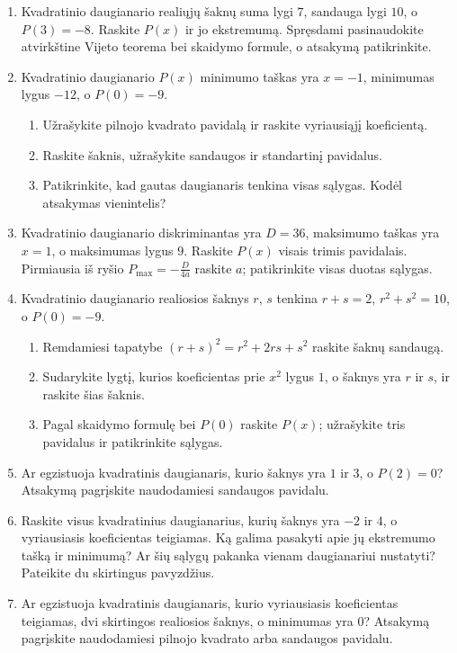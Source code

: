 \documentclass[12pt,a4paper]{article}
\begin{document}
\begin{enumerate}[series=uzdaviniai]
\begin{enumerate}
\item Užrašykite $P(x)$ sandaugos pavidalu ir pagal $P(0)$ raskite vyriausiąjį koeficientą.
\item Užrašykite visus tris daugianario pavidalus ir patikrinkite sąlygas.
\end{enumerate}
\item Kvadratinio daugianario realiųjų šaknų suma lygi $7$, sandauga lygi $10$, o $P(3)=-8$. Raskite $P(x)$ ir jo ekstremumą. Spręsdami pasinaudokite atvirkštine Vijeto teorema bei skaidymo formule, o atsakymą patikrinkite.
\item Kvadratinio daugianario $P(x)$ minimumo taškas yra $x=-1$, minimumas lygus $-12$, o $P(0)=-9$.
\begin{enumerate}
\item Užrašykite pilnojo kvadrato pavidalą ir raskite vyriausiąjį koeficientą.
\item Raskite šaknis, užrašykite sandaugos ir standartinį pavidalus.
\item Patikrinkite, kad gautas daugianaris tenkina visas sąlygas. Kodėl atsakymas vienintelis?
\end{enumerate}
\item Kvadratinio daugianario diskriminantas yra $D=36$, maksimumo taškas yra $x=1$, o maksimumas lygus $9$. Raskite $P(x)$ visais trimis pavidalais. Pirmiausia iš ryšio $P_{\max}=-\frac{D}{4a}$ raskite $a$; patikrinkite visas duotas sąlygas.
\item Kvadratinio daugianario realiosios šaknys $r$, $s$ tenkina $r+s=2$, $r^2+s^2=10$, o $P(0)=-9$.
\begin{enumerate}
\item Remdamiesi tapatybe $(r+s)^2=r^2+2rs+s^2$ raskite šaknų sandaugą.
\item Sudarykite lygtį, kurios koeficientas prie $x^2$ lygus $1$, o šaknys yra $r$ ir $s$, ir raskite šias šaknis.
\item Pagal skaidymo formulę bei $P(0)$ raskite $P(x)$; užrašykite tris pavidalus ir patikrinkite sąlygas.
\end{enumerate}
\item Ar egzistuoja kvadratinis daugianaris, kurio šaknys yra $1$ ir $3$, o $P(2)=0$? Atsakymą pagrįskite naudodamiesi sandaugos pavidalu.
\item Raskite visus kvadratinius daugianarius, kurių šaknys yra $-2$ ir $4$, o vyriausiasis koeficientas teigiamas. Ką galima pasakyti apie jų ekstremumo tašką ir minimumą? Ar šių sąlygų pakanka vienam daugianariui nustatyti? Pateikite du skirtingus pavyzdžius.
\item Ar egzistuoja kvadratinis daugianaris, kurio vyriausiasis koeficientas teigiamas, dvi skirtingos realiosios šaknys, o minimumas yra $0$? Atsakymą pagrįskite naudodamiesi pilnojo kvadrato arba sandaugos pavidalu.
\end{enumerate}
\end{document}
